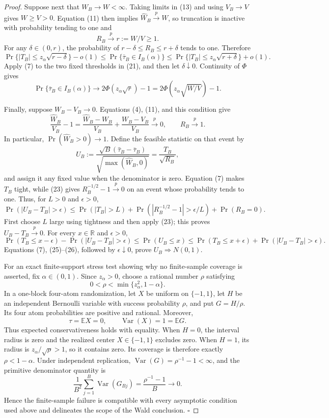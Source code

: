 \documentclass{article}
\begin{document}
\begin{proof}
Suppose next that \(W_B\to W<\infty\). Taking limits in (13) and using \(V_B\to V\) gives \(W\ge V>0\). Equation (11) then implies \(\widehat W_B\xrightarrow{p}W\), so truncation is inactive with probability tending to one and
\[
R_B\xrightarrow{p}r:=W/V\ge1.
\tag{20}
\]
For any \(\delta\in(0,r)\), the probability of \(r-\delta\le R_B\le r+\delta\) tends to one. Therefore
\[
\Pr\{|T_B|\le z_\alpha\sqrt{r-\delta}\}-o(1)
\le \Pr\{\bar\tau_B\in I_B(\alpha)\}
\le \Pr\{|T_B|\le z_\alpha\sqrt{r+\delta}\}+o(1).
\tag{21}
\]
Apply (7) to the two fixed thresholds in (21), and then let \(\delta\downarrow0\). Continuity of \(\Phi\) gives
\[
\Pr\{\bar\tau_B\in I_B(\alpha)\}
\longrightarrow
2\Phi(z_\alpha\sqrt r)-1
=2\Phi\!\left(z_\alpha\sqrt{W/V}\right)-1.
\tag{22}
\]

Finally, suppose \(W_B-V_B\to0\). Equations (4), (11), and this condition give
\[
\frac{\widehat W_B}{V_B}-1
=\frac{\widehat W_B-W_B}{V_B}
+\frac{W_B-V_B}{V_B}
\xrightarrow{p}0,
\qquad
R_B\xrightarrow{p}1.
\tag{23}
\]
In particular, \(\Pr(\widehat W_B>0)\to1\). Define the feasible statistic on that event by
\[
U_B:=\frac{\sqrt B(\widehat\tau_B-\bar\tau_B)}
{\sqrt{\max(\widehat W_B,0)}}
=\frac{T_B}{\sqrt{R_B}},
\tag{24}
\]
and assign it any fixed value when the denominator is zero. Equation (7) makes \(T_B\) tight, while (23) gives \(R_B^{-1/2}-1\xrightarrow{p}0\) on an event whose probability tends to one. Thus, for \(L>0\) and \(\epsilon>0\),
\[
\Pr(|U_B-T_B|>\epsilon)
\le \Pr(|T_B|>L)
+\Pr(|R_B^{-1/2}-1|>\epsilon/L)
+\Pr(R_B=0).
\tag{25}
\]
First choose \(L\) large using tightness and then apply (23); this proves \(U_B-T_B\xrightarrow{p}0\). For every \(x\in\mathbb R\) and \(\epsilon>0\),
\[
\Pr(T_B\le x-\epsilon)-\Pr(|U_B-T_B|>\epsilon)
\le\Pr(U_B\le x)
\le\Pr(T_B\le x+\epsilon)+\Pr(|U_B-T_B|>\epsilon).
\tag{26}
\]
Equations (7), (25)--(26), followed by \(\epsilon\downarrow0\), prove \(U_B\Rightarrow N(0,1)\).

For an exact finite-support stress test showing why no finite-sample coverage is asserted, fix \(\alpha\in(0,1)\). Since \(z_\alpha>0\), choose a rational number \(\rho\) satisfying
\[
0<\rho<\min\{z_\alpha^2,1-\alpha\}.
\tag{27}
\]
In a one-block four-atom randomization, let \(X\) be uniform on \(\{-1,1\}\), let \(H\) be an independent Bernoulli variable with success probability \(\rho\), and put \(G=H/\rho\). Its four atom probabilities are positive and rational. Moreover,
\[
\tau=\mathbb E X=0,
\qquad
\operatorname{Var}(X)=1=\mathbb E G.
\tag{28}
\]
Thus expected conservativeness holds with equality. When \(H=0\), the interval radius is zero and the realized center \(X\in\{-1,1\}\) excludes zero. When \(H=1\), its radius is \(z_\alpha/\sqrt\rho>1\), so it contains zero. Its coverage is therefore exactly \(\rho<1-\alpha\). Under independent replication, \(\operatorname{Var}(G)=\rho^{-1}-1<\infty\), and the primitive denominator quantity is
\[
\frac1{B^2}\sum_{j=1}^B\operatorname{Var}(G_{Bj})
=\frac{\rho^{-1}-1}{B}\longrightarrow0.
\tag{29}
\]
Hence the finite-sample failure is compatible with every asymptotic condition used above and delineates the scope of the Wald conclusion. \(\square\)
\end{proof}
\end{document}
